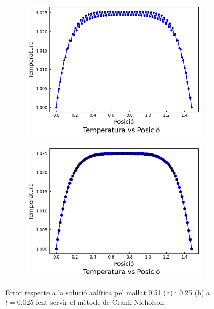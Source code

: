 \documentclass{article}
\begin{document}
\begin{figure}[h]
    \centering
    \begin{subfigure}[b]{0.35\textwidth}
        \includegraphics[width=\textwidth]{images/T_vs_z_at1.png} 
        \caption{}
        \label{fig:err_CN_at1}
    \end{subfigure}
    \hspace{1.5cm}
    \begin{subfigure}[b]{0.35\textwidth}
        \includegraphics[width=\textwidth]{images/T_vs_z_at2.png}
        \caption{} 
        \label{fig:err_CN_at2}
    \end{subfigure}
    \caption{Error respecte a la solució aalítica pel mallat 0.51 (a) i 0.25 (b) a $\tilde{t}=0.025$ fent servir el mètode de Crank-Nicholson.}
    \label{fig:crank_nicholson}
\end{figure}
\end{document}
